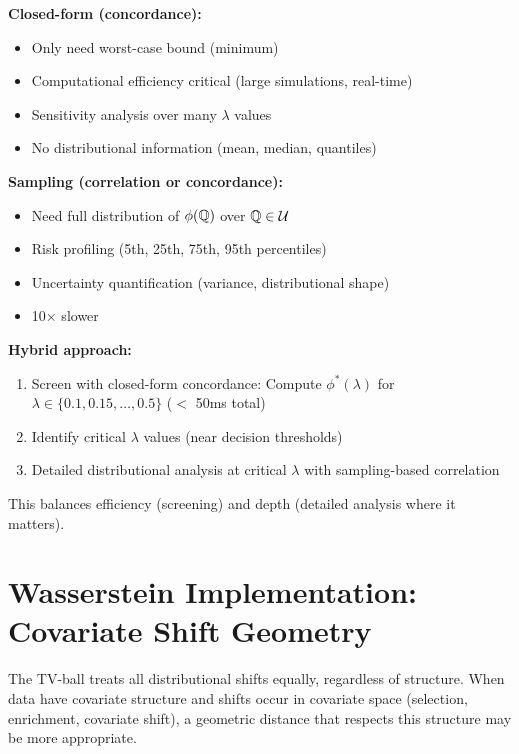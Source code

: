 \documentclass{article}
\begin{document}
\textbf{Closed-form (concordance):}
\begin{itemize}
    \item[$\checkmark$] Only need worst-case bound (minimum)
    \item[$\checkmark$] Computational efficiency critical (large simulations, real-time)
    \item[$\checkmark$] Sensitivity analysis over many $\lambda$ values
    \item[$\times$] No distributional information (mean, median, quantiles)
\end{itemize}

\textbf{Sampling (correlation or concordance):}
\begin{itemize}
    \item[$\checkmark$] Need full distribution of $\phi(\mathbb{Q})$ over $\mathbb{Q} \in \mathcal{U}$
    \item[$\checkmark$] Risk profiling (5th, 25th, 75th, 95th percentiles)
    \item[$\checkmark$] Uncertainty quantification (variance, distributional shape)
    \item[$\times$] 10$\times$ slower
\end{itemize}

\textbf{Hybrid approach:}
\begin{enumerate}
    \item Screen with closed-form concordance: Compute $\phi^*(\lambda)$ for $\lambda \in \{0.1, 0.15, \ldots, 0.5\}$ ($<$ 50ms total)
    \item Identify critical $\lambda$ values (near decision thresholds)
    \item Detailed distributional analysis at critical $\lambda$ with sampling-based correlation
\end{enumerate}

This balances efficiency (screening) and depth (detailed analysis where it matters).

\section{Wasserstein Implementation: Covariate Shift Geometry}\label{sec:wasserstein-implementation}

The TV-ball treats all distributional shifts equally, regardless of structure. When data have covariate structure and shifts occur in covariate space (selection, enrichment, covariate shift), a geometric distance that respects this structure may be more appropriate.
\end{document}
